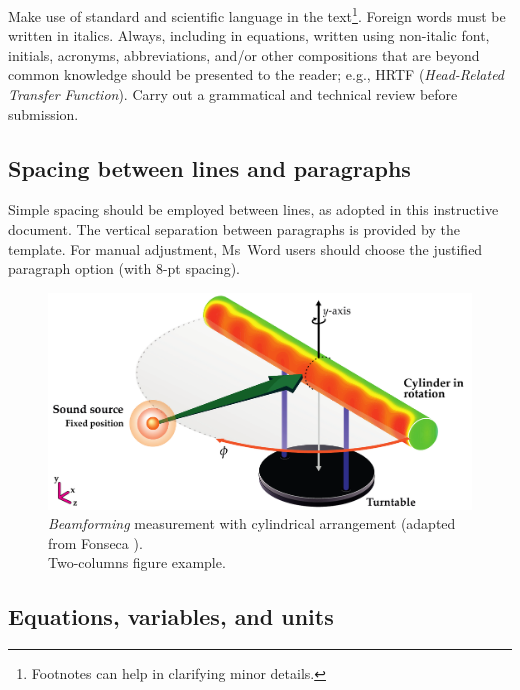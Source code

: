 \documentclass[12pt, a4paper, twoside, twocolumn]{article}
\begin{document}
Make use of standard and scientific language in the text\footnote{Footnotes can help in clarifying minor details.}. Foreign words must be written in italics. Always, including in equations, written using non-italic font, initials, acronyms, abbreviations, and/or other compositions that are beyond common knowledge should be presented to the reader; e.g., HRTF (\textit{Head-Related Transfer Function}). Carry out a grammatical and technical review before submission.

\subsection{Spacing between lines and paragraphs}

Simple spacing should be employed between lines, as adopted in this instructive document. The vertical separation between paragraphs is provided by the template. For manual adjustment, Ms~Word users should choose the justified paragraph option (with 8-pt spacing).


\begin{figure}[!ht] %
	\centering
	\includegraphics[width=0.74\linewidth]{figs/Measurement-Scheme-Fonseca-2013-en.pdf}%
	\caption{\textit{Beamforming} measurement with cylindrical arrangement (adapted from Fonseca \cite{Fonseca-2013}).\\ Two-columns figure example.}%
	\label{fig:beamforming}%
\end{figure}

\subsection{Equations, variables, and units}
\end{document}
